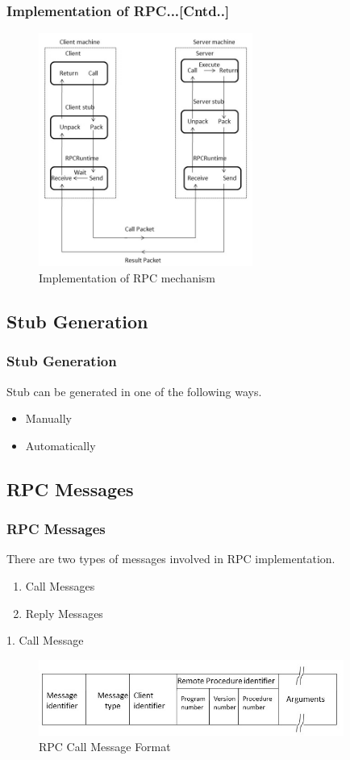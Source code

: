 \documentclass{beamer}
\begin{document}
\begin{frame}
	\frametitle{Implementation of RPC...[Cntd..]}
	\begin{figure}
		\centering
		\includegraphics[width=7cm]{fig42.jpg}
		\caption{Implementation of RPC mechanism}
	\end{figure}
\end{frame}


\subsection{Stub Generation}
\begin{frame}
	\frametitle{Stub Generation}
	Stub can be generated in one of the following ways.
	\begin{itemize}
		\item Manually
		\item Automatically
	\end{itemize}
	\vspace{6cm}
\end{frame}

\subsection{RPC Messages}
\begin{frame}
	\frametitle{RPC Messages}
	There are two types of messages involved in RPC implementation.
	\begin{enumerate}
		\item Call Messages
		\item Reply Messages
	\end{enumerate}
	\vspace{1cm}
	1. Call Message\\
	\begin{figure}
		\centering
		\includegraphics[width=10cm]{fig43.jpg}
		\caption{RPC Call Message Format}
	\end{figure}
\end{frame}
\end{document}
